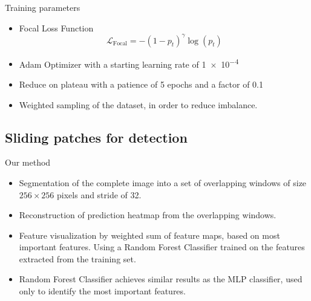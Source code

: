 \begin{frame}{Training parameters}
    \begin{itemize}
        \item Focal Loss Function \begin{equation*}
            \mathcal{L}_{\text{Focal}} = -(1 - p_t)^\gamma \log{(p_t)}
        \end{equation*}
        \item Adam Optimizer with a starting learning rate of \num{1e-4}
        \item Reduce on plateau with a patience of 5 epochs and a factor of \num{0.1}
        \item Weighted sampling of the dataset, in order to reduce imbalance.
    \end{itemize}
\end{frame}

\subsection{Sliding patches for detection}

\begin{frame}{Our method}
    \begin{itemize}
        \item Segmentation of the complete image into a set of overlapping windows of size $256 \times 256$ pixels and stride of \SI{32}{\pixel}.
        \item Reconstruction of prediction heatmap from the overlapping windows.
        \item Feature visualization by weighted sum of feature maps, based on most important features. Using a Random Forest Classifier trained on the features extracted from the training set.
        \item Random Forest Classifier achieves similar results as the MLP classifier, used only to identify the most important features.
    \end{itemize}
\end{frame}
